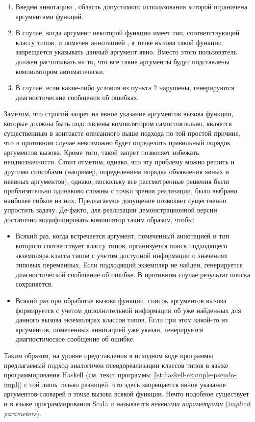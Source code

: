 \begin{enumerate} 
    \item Введем аннотацию , область допустимого использования которой ограничена аргументами функций. 
    \item В случае, когда аргумент некоторой функции имеет тип, соответствующий классу типов, и помечен аннотацией , в точке вызова такой функции запрещается указывать данный аргумент явно. Вместо этого пользователь должен расчитывать на то, что все такие аргументы будут подставлены компилятором автоматически. 
    \item В случае, если какие-либо условия из пункта $2$ нарушены, генерируются диагностические сообщения об ошибках.
\end{enumerate}
 Заметим, что строгий запрет на явное указание аргументов вызова функции, которые должны быть подставлены компилятором самостоятельно, является существенным в контексте описанного выше подхода по той простой причине, что в противном случае невозможно будет определить правильный порядок аргументов вызова. Кроме того, такой запрет позволяет избежать неоднозначности. Стоит отметим, однако, что эту проблему можно решить и другими способами (например, определением порядка объявления явных и неявных аргументов), однако, поскольку все рассмотренные решения были приблизительно одинаково сложны с точки зрения реализации, было выбрано наиболее гибкое из них. Предлагаемое допущение позволяет существенно упростить задачу. Де-факто, для реализации демонстрационной версии достаточно модифицировать компилятор таким образом, чтобы:
\begin{itemize}
    \item Всякий раз, когда встречается аргумент, помеченный аннотацией  и тип которого соответствует классу типов, организуется поиск подходящего экземпляра класса типов с учетом доступной информации о значениях типовых переменных. Если подходящий экземпляр не найден, генерируется диагностической сообщение об ошибке. В противном случае результат поиска сохраняется.
    \item Всякий раз при обработке вызова функции, список аргументов вызова формируется с учетом дополнительной информации об уже найденных для данного вызова экземплярах классов типов. Если при этом какой-то из аргументов, помеченных аннотацией  уже указан, генерируется диагностическое сообщение об ошибке.
\end{itemize}
Таким образом, на уровне представления в исходном коде программы предлагаемый подход аналогичен  псевдореализации классов типов в языке программирования Haskell (см. текст программы \ref{lst:haskell-example-pseudo-impl}) с той лишь только разницей, что здесь запрещается явное указание аргументов-словарей в точке вызова всякой функции. Нечто подобное существует и в языке программирования Scala и называется \emph{неявными параметрами} (\emph{implicit parameters}). 

